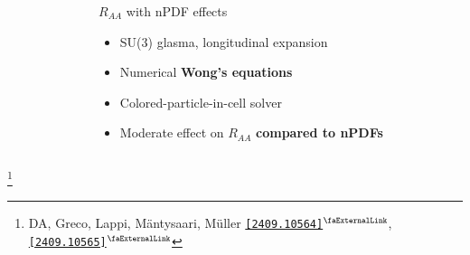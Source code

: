 \documentclass[aspectratio=169,11pt,usenames,dvipsnames]{beamer}
\renewcommand{\thefootnote}{\color{customblue}\faPaperPlaneO}
\newcommand\blfootnote[1]{%
  \begingroup
  \renewcommand\thefootnote{}\footnote{#1}%
  \addtocounter{footnote}{-1}%
  \endgroup
}
\begin{document}
\begin{frame}[t,noframenumbering]
\begin{columns}[onlytextwidth,t]
\begin{figure}
        \end{figure}
        \begin{center}
            {\Large\color{palteal} $R_{AA}$ with nPDF effects \\[10pt]}
            \footnotesize
                \begin{itemize}
                    \item {\color{lightgray}SU(3) glasma, longitudinal expansion}
                    \item {\color{lightgray}Numerical {\bfseries Wong's equations}}
                    \item {\color{lightgray}Colored-particle-in-cell solver}
                    \item {\color{lightgray}Moderate effect on $R_{AA}$ {\bfseries compared to nPDFs}}
                \end{itemize}
        \end{center}
    \end{columns}
    \blfootnote{\scriptsize DA, Greco, Lappi, Mäntysaari, M\"{u}ller \href{https://arxiv.org/abs/2409.10564}{\color{palgold}\texttt{[2409.10564]}$^\text{\scalebox{0.9}{\faExternalLink}}$}, \href{https://arxiv.org/abs/2409.10565}{\color{palgold}\texttt{[2409.10565]}$^\text{\scalebox{0.9}{\faExternalLink}}$}}
\end{frame}



\end{document}
